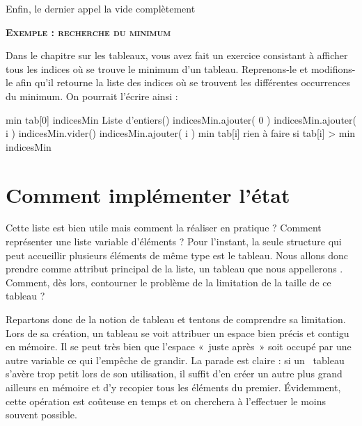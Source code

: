 		Enfin, le dernier appel la vide complètement
		
		\bigskip
		{\sffamily\bfseries\scshape
		Exemple : recherche du minimum}
		
		Dans le chapitre sur les tableaux, vous avez fait un exercice consistant
		à afficher tous les indices où se trouve le minimum d’un tableau.
		Reprenons-le et modifions-le afin qu’il retourne la liste des indices
		où se trouvent les différentes occurrences du minimum. On pourrait
		l’écrire ainsi :
		
		\begin{LDA}
				\Let min \Gets tab[0]
				\Let indicesMin \Gets {} Liste d'entiers()
				\Stmt indicesMin.ajouter( 0 )
						\Stmt indicesMin.ajouter( i )
						\Stmt indicesMin.vider() 
						\Stmt indicesMin.ajouter( i )
						\Let min \Gets tab[i]
					\EndIf \Comment rien à faire si tab[i] > min
				\EndFor
				\Return indicesMin
			\EndAlgo
		\end{LDA}
	
	\section{Comment implémenter l’état}
	
		Cette liste est bien utile mais comment la réaliser en pratique ?
		Comment représenter une liste variable d’éléments ? Pour
		l'instant, la seule structure qui peut accueillir
		plusieurs éléments de même type est le tableau. Nous allons donc
		prendre comme attribut principal de la liste, un tableau que nous
		appellerons . Comment, dès lors, contourner
		le problème de la limitation de la taille de ce tableau ?
		
		Repartons donc de la notion de tableau et tentons de comprendre sa
		limitation. Lors de sa création, un tableau se voit attribuer un espace
		bien précis et contigu en mémoire. Il se peut très bien que
		l'espace «~juste après~» soit occupé par une autre
		variable ce qui l'empêche de grandir. La parade est
		claire : si un \ tableau s’avère trop petit lors de son utilisation, il
		suffit d’en créer un autre plus grand ailleurs en mémoire et d’y
		recopier tous les éléments du premier. Évidemment, cette opération est
		coûteuse en temps et on cherchera à l’effectuer le moins souvent
		possible.
		
